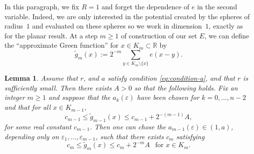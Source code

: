 \documentclass[JEP,XML,SOM,Unicode,published]{cedram}
\let\sm\setminus
\let\wt\widetilde
\numberwithin{equation}{section}
\theoremstyle{plain}
\newtheorem{lem}{Lemma}[section]
\theoremstyle{definition}
\newcommand{\R}{\mathbb{R}}
\let\sm\setminus
\newcommand{\R}{\mathbb{R}}
\begin{document}
In this paragraph, we fix $R=1$ and forget the dependence of $e$ in the second variable. Indeed, we are only interested in the potential created by the spheres of radius~$1$ and evaluated on these spheres so we work in dimension~$1$, exactly as for the planar result.
At a step $m \ge 1$ of construction of our set $E$, we can define the ``approximate Green
function'' for $x\in K_m\subset \R$ by %
\begin{equation*}
\wt g _m(x):= 2^{-m} \sum_{y\in K_m\sm \{x\}} e(x-y).
\end{equation*}
\begin{lem}\label{mainLemma2}
Assume that $r$, and $a$ satisfy condition \eqref{eq:condition-a}, and that $r$ is sufficiently small. Then there exists $A >0$ so that the following holds.
Fix an integer $m\ge 1$ and suppose that the $a_k(\varepsilon)$ have been chosen for $k= 0,\dots, n-2$
and that for all $x \in K_{m-1}$,
\begin{equation}\label{eq:2iter-step-n-1}
c_{m-1} \le \wt g_{m-1}(x) \le c_{m-1} + 2^{-(m-1)} A,
\end{equation}
for some real constant $c_{m-1}$. Then one can chose the $a_{m-1}(\varepsilon)\in (1,a)$,
depending only on $\varepsilon_1, \dotsc, \varepsilon_{m-1}$,
such that there exists $c_m$
satisfying
\begin{equation}\label{eq:2iter-step-n}
c_m \le \wt g_m (x) \le c_m + 2^{-m} A
\ \ \text{ for $x\in K_m$.}
\end{equation}
\end{lem}
\end{document}
